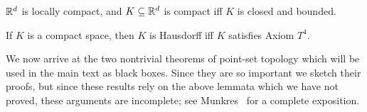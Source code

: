 \begin{theorem}
$\mathbb{R}^{d}$ is locally compact, and $K \subseteq \mathbb{R}^{d}$ is compact iff $K$ is closed and bounded.
\end{theorem}

\begin{lemma}
If $K$ is a compact space, then $K$ is Hausdorff iff $K$ satisfies Axiom $T^{4}$.
\end{lemma}

\begin{subsec}
We now arrive at the two nontrivial theorems of point-set topology which will be used in the main text as black boxes.
Since they are so important we sketch their proofs, but since these results rely on the above lemmata which we have not proved, these arguments are incomplete; see Munkres~\cite{munkres2000topology} for a complete exposition.
\end{subsec}


